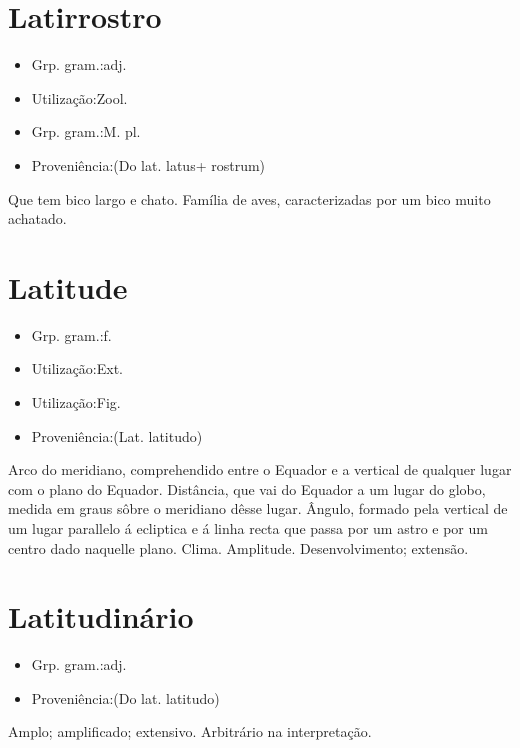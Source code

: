 \section{Latirrostro}
\begin{itemize}
\item {Grp. gram.:adj.}
\end{itemize}
\begin{itemize}
\item {Utilização:Zool.}
\end{itemize}
\begin{itemize}
\item {Grp. gram.:M. pl.}
\end{itemize}
\begin{itemize}
\item {Proveniência:(Do lat. \textunderscore latus\textunderscore  + \textunderscore rostrum\textunderscore )}
\end{itemize}
Que tem bico largo e chato.
Família de aves, caracterizadas por um bico muito achatado.
\section{Latitude}
\begin{itemize}
\item {Grp. gram.:f.}
\end{itemize}
\begin{itemize}
\item {Utilização:Ext.}
\end{itemize}
\begin{itemize}
\item {Utilização:Fig.}
\end{itemize}
\begin{itemize}
\item {Proveniência:(Lat. \textunderscore latitudo\textunderscore )}
\end{itemize}
Arco do meridiano, comprehendido entre o Equador e a vertical de qualquer lugar com o plano do Equador.
Distância, que vai do Equador a um lugar do globo, medida em graus sôbre o meridiano dêsse lugar.
Ângulo, formado pela vertical de um lugar parallelo á ecliptica e á linha recta que passa por um astro e por um centro dado naquelle plano.
Clima.
Amplitude.
Desenvolvimento; extensão.
\section{Latitudinário}
\begin{itemize}
\item {Grp. gram.:adj.}
\end{itemize}
\begin{itemize}
\item {Proveniência:(Do lat. \textunderscore latitudo\textunderscore )}
\end{itemize}
Amplo; amplificado; extensivo.
Arbitrário na interpretação.
